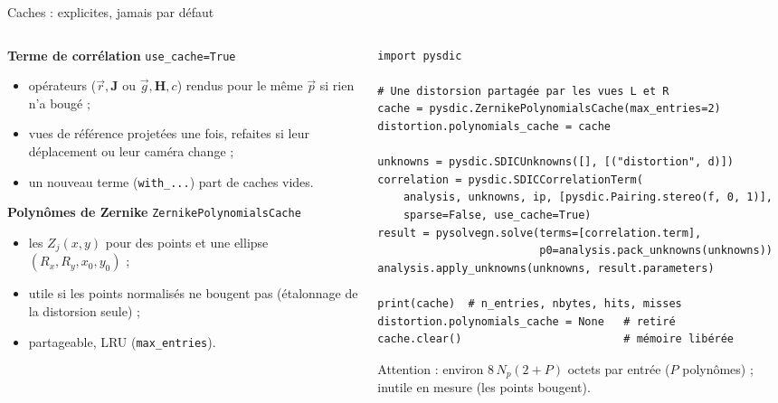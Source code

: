 \documentclass[aspectratio=169,11pt]{beamer}
\newcommand{\cls}[1]{\textcolor{pyblue}{\texttt{#1}}}
\begin{document}
\begin{frame}[fragile]{Caches : explicites, jamais par défaut}
  \begin{columns}[T]
    \begin{column}{0.50\textwidth}\scriptsize
      \textbf{Terme de corrélation} \hfill \texttt{use\_cache=True}
      \begin{itemize}\setlength{\itemsep}{0pt}
        \item \alert{opérateurs} ($\vec{r}, \mathbf{J}$ ou $\vec{g}, \mathbf{H}, c$) rendus
              pour le même $\vec{p}$ \alert{si rien n'a bougé} ;
        \item \alert{vues de référence} projetées une fois, refaites si leur
              déplacement ou leur caméra change ;
        \item un nouveau terme (\texttt{with\_...}) part de caches vides.
      \end{itemize}
      \smallskip
      \textbf{Polynômes de Zernike} \hfill \cls{ZernikePolynomialsCache}
      \begin{itemize}\setlength{\itemsep}{0pt}
        \item les $Z_j(x, y)$ pour des points et une ellipse $(R_x, R_y, x_0, y_0)$ ;
        \item utile si les points normalisés ne bougent pas (étalonnage de la
              distorsion seule) ;
        \item \alert{partageable}, LRU (\texttt{max\_entries}).
      \end{itemize}
    \end{column}
    \begin{column}{0.48\textwidth}
\begin{lstlisting}[basicstyle=\ttfamily\tiny]
import pysdic
 
# Une distorsion partagée par les vues L et R
cache = pysdic.ZernikePolynomialsCache(max_entries=2)
distortion.polynomials_cache = cache
 
unknowns = pysdic.SDICUnknowns([], [("distortion", d)])
correlation = pysdic.SDICCorrelationTerm(
    analysis, unknowns, ip, [pysdic.Pairing.stereo(f, 0, 1)],
    sparse=False, use_cache=True)
result = pysolvegn.solve(terms=[correlation.term],
                         p0=analysis.pack_unknowns(unknowns))
analysis.apply_unknowns(unknowns, result.parameters)
 
print(cache)  # n_entries, nbytes, hits, misses
distortion.polynomials_cache = None   # retiré
cache.clear()                         # mémoire libérée
\end{lstlisting}
      \tiny \textcolor{pyred}{Attention :} environ $8\,N_p (2 + P)$ octets par entrée
      ($P$ polynômes) ; inutile en mesure (les points bougent).
    \end{column}
  \end{columns}
\end{frame}
\end{document}
